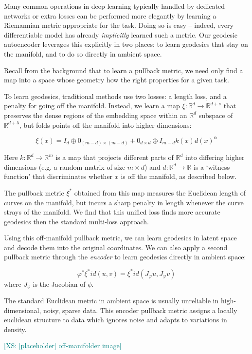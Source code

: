 \documentclass{article}
\theoremstyle{plain}
\theoremstyle{definition}
\theoremstyle{remark}
\newcommand{\xin}[1]{\textcolor{teal}{[XS: #1]}}
\begin{document}
Many common operations in deep learning typically handled by dedicated networks or extra losses can be performed more elegantly by learning a Riemannian metric appropriate for the task. Doing so is easy – indeed, every differentiable model has already \emph{implicitly} learned such a metric. Our geodesic autoencoder leverages this explicitly in two places: to learn geodesics that stay on the manifold, and to do so directly in ambient space.

Recall from the background that to learn a pullback metric, we need only find a map into a space whose geometry how the right properties for a given task.

To learn geodesics, traditional methods use two losses: a length loss, and a penalty for going off the manifold. Instead, we learn a map $\xi: \mathbb{R}^{d} \rightarrow \mathbb{R}^{d+s}$ that preserves the dense regions of the embedding space within an $\mathbb{R}^{d}$ subspace of $\mathbb{R}^{d+5}$, but folds points off the manifold into higher dimensions:

$$
\xi(x) = I_d \oplus 0_{(m-d) \times(m-d)} + 0_{d \times d} \oplus I_{m-d} k(x) d(x)^\alpha
$$

Here $k:\mathbb{R}^d \to \mathbb{R}^m$ is a map that projects different parts of $\mathbb{R}^d$ into differing higher dimensions (e.g. a random matrix of size $m \times d$) and $d:\mathbb{R}^d \to \mathbb{R}$ is a `witness function' that discriminates whether $x$ is off the manifold, as described below.

The pullback metric $\xi^{*}$ obtained from this map measures the Euclidean length of curves on the manifold, but incurs a sharp penalty in length whenever the curve strays of the manifold. 
We find that this unified loss finds more accurate geodesics then the standard multi-loss approach.

Using this off-manifold pullback metric, we can learn geodesics in latent space and decode them into the original coordinates. We can also apply a second pullback metric through the \emph{encoder} to learn geodesics directly in ambient space:

$$
\varphi^{*} \xi^{*} id(u, v)=\xi^*id\left(J_{\varphi} u, J_{\varphi} v\right)
$$
where $J_{\phi}$ is the Jacobian of $\phi$.

The standard Euclidean metric in ambient space is usually unreliable in high-dimensional, noisy, sparse data. This encoder pullback metric assigns a locally euclidean structure to data which ignores noise and adapts to variations in density.
\par\xin{[placeholder] off-manifolder image}
\end{document}
